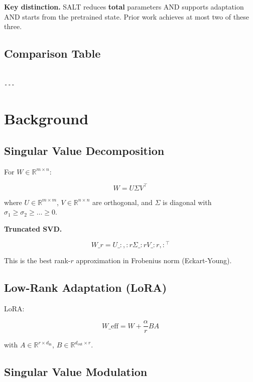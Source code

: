 \textbf{Key distinction.} SALT reduces \textbf{total} parameters AND supports 
adaptation AND starts from the pretrained state. Prior work achieves at most 
two of these three.



\subsection{Comparison Table}

\begin{lstlisting}

---
\end{lstlisting}


\section{Background}

\subsection{Singular Value Decomposition}

For $W \in \mathbb{R}^{m \times n}$:

\[
W = U \Sigma V^\top
\tag{3.1}
\]

where $U \in \mathbb{R}^{m \times m}$, $V \in \mathbb{R}^{n \times n}$ are 
orthogonal, and $\Sigma$ is diagonal with $\sigma_1 \geq \sigma_2 \geq \dots \geq 0$.

\textbf{Truncated SVD.}

\[
W\_r = U\_{:, :r} \Sigma\_{:r} V\_{:r, :}^\top
\tag{3.2}
\]

This is the best rank-$r$ approximation in Frobenius norm (Eckart-Young).

\subsection{Low-Rank Adaptation (LoRA)}

LoRA:

\[
W\_\text{eff} = W + \frac{\alpha}{r} BA
\tag{3.3}
\]

with $A \in \mathbb{R}^{r \times d_\text{in}}$, $B \in \mathbb{R}^{d_\text{out} \times r}$.

\subsection{Singular Value Modulation}

